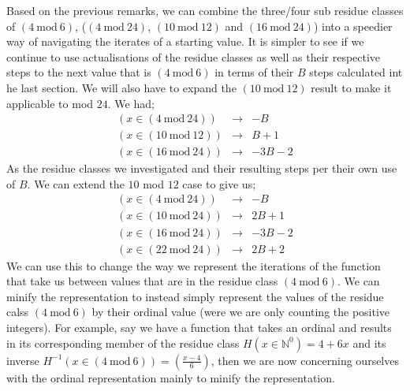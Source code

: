 \documentclass[12pt,a4paper]{amsart}
\numberwithin{equation}{section}
\theoremstyle{plain}
\theoremstyle{definition}
\begin{document}
Based on the previous remarks, we can combine the three/four sub residue classes of $\left ( 4\:\mathrm{mod}\:6 \right )$, ($\left ( 4\:\mathrm{mod}\:24 \right )$, $\left ( 10\:\mathrm{mod}\:12 \right )$ and $\left ( 16\:\mathrm{mod}\:24 \right )$) into a speedier way of navigating the iterates of a starting value. It is simpler to see if we continue to use actualisations of the residue classes as well as their respective steps to the next value that is $\left ( 4\:\mathrm{mod}\:6 \right )$ in terms of their $B$ steps calculated int he last section. We will also have to expand the $\left ( 10\:\mathrm{mod}\:12 \right )$ result to make it applicable to mod $24$. We had;
\begin{equation}
\begin{matrix}
\left ( x \in \left (  4\:\mathrm{mod}\:24 \right ) \right ) & \rightarrow  & -B \\ 
\left ( x \in \left ( 10\:\mathrm{mod}\:12 \right ) \right ) & \rightarrow  & B+1 \\ 
\left ( x \in \left ( 16\:\mathrm{mod}\:24 \right ) \right ) & \rightarrow  & -3B-2
\end{matrix}
\end{equation}
As the residue classes we investigated and their resulting steps per their own use of $B$. We can extend the $10$ mod $12$ case to give us;
\begin{equation}
\begin{matrix}
\left ( x \in \left (  4\:\mathrm{mod}\:24 \right ) \right ) & \rightarrow  & -B \\ 
\left ( x \in \left ( 10\:\mathrm{mod}\:24 \right ) \right ) & \rightarrow  & 2B+1 \\ 
\left ( x \in \left ( 16\:\mathrm{mod}\:24 \right ) \right ) & \rightarrow  & -3B-2 \\
\left ( x \in \left ( 22\:\mathrm{mod}\:24 \right ) \right ) & \rightarrow  & 2B+2
\end{matrix}
\end{equation}
We can use this to change the way we represent the iterations of the function that take us between values that are in the residue class $\left ( 4\:\mathrm{mod}\:6 \right )$. We can minify the representation to instead simply represent the values of the residue calss $\left ( 4\:\mathrm{mod}\:6 \right )$ by their ordinal value (were we are only counting the positive integers). For example, say we have a function that takes an ordinal and results in its corresponding member of the residue class $H\left( x \in \mathbb{N}^{0}  \right ) = 4+6x$ and its inverse $H^{-1}\left ( x \in \left ( 4\:\mathrm{mod}\:6 \right ) \right ) = \left ( \frac{x-4}{6} \right )$, then we are now concerning ourselves with the ordinal representation mainly to minify the representation.
\end{document}
